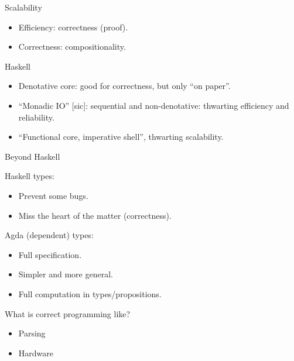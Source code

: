 \documentclass[aspectratio=169]{beamer}
\begin{document}
\begin{frame}{Scalability}
\begin{itemize}\itemsep3ex
\item Efficiency: correctness (proof).
\item Correctness: compositionality.
\end{itemize}
\end{frame}

\begin{frame}{Haskell}
\begin{itemize}\itemsep3ex
\item Denotative core: good for correctness, but only ``on paper''.
\item ``Monadic IO'' [sic]: sequential and non-denotative: thwarting efficiency and reliability.
\item ``Functional core, imperative shell'', thwarting scalability.
\end{itemize}
\end{frame}

\begin{frame}{Beyond Haskell}

Haskell types:
\begin{itemize}\itemsep3ex
\item Prevent some bugs.
\item Miss the heart of the matter (correctness).
\end{itemize}

\pause
\vspace{4ex}

Agda (dependent) types:
\begin{itemize}\itemsep3ex
\item Full specification.
\item Simpler and more general.
\item Full computation in types/propositions.
\end{itemize}
\end{frame}

\begin{frame}{What is correct programming like?}

\begin{itemize}\itemsep3ex
\item Parsing
\item Hardware
\end{itemize}


\end{frame}
\end{document}
